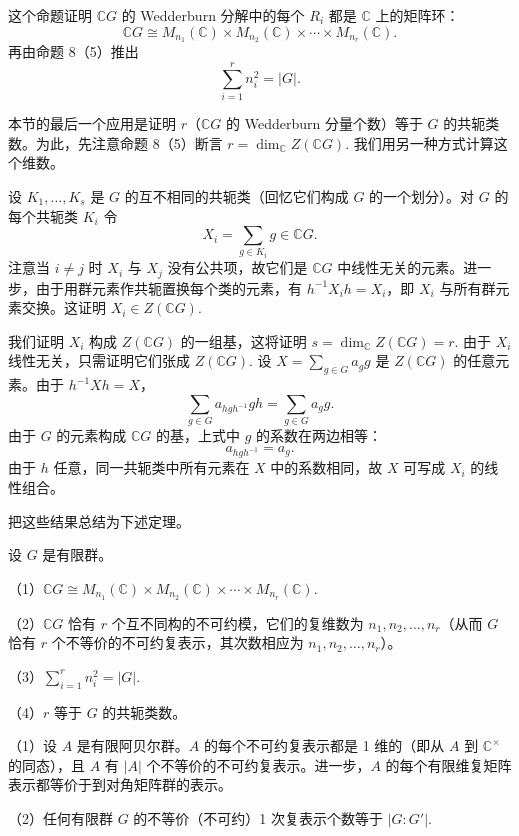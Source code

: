 这个命题证明 \(\mathbb{C}G\) 的 Wedderburn 分解中的每个 \(R_i\) 都是 \(\mathbb{C}\) 上的矩阵环：
\[
\mathbb{C}G \cong M_{n_1}(\mathbb{C}) \times M_{n_2}(\mathbb{C}) \times \cdots \times M_{n_r}(\mathbb{C}).
\]
再由命题 8（5）推出
\[
\sum_{i=1}^{r}n_i^2 = |G|.
\]

本节的最后一个应用是证明 \(r\)（\(\mathbb{C}G\) 的 Wedderburn 分量个数）等于 \(G\) 的共轭类数。为此，先注意命题 8（5）断言 \(r = \dim_{\mathbb C}Z(\mathbb{C}G)\). 我们用另一种方式计算这个维数。

设 \(K_1, \ldots, K_s\) 是 \(G\) 的互不相同的共轭类（回忆它们构成 \(G\) 的一个划分）。对 \(G\) 的每个共轭类 \(K_i\) 令
\[
X_i = \sum_{g \in K_i}g \in \mathbb{C}G.
\]
注意当 \(i \neq j\) 时 \(X_i\) 与 \(X_j\) 没有公共项，故它们是 \(\mathbb{C}G\) 中线性无关的元素。进一步，由于用群元素作共轭置换每个类的元素，有 \(h^{-1}X_ih = X_i\)，即 \(X_i\) 与所有群元素交换。这证明 \(X_i \in Z(\mathbb{C}G)\).

我们证明 \(X_i\) 构成 \(Z(\mathbb{C}G)\) 的一组基，这将证明 \(s = \dim_{\mathbb C}Z(\mathbb{C}G) = r\). 由于 \(X_i\) 线性无关，只需证明它们张成 \(Z(\mathbb{C}G)\). 设 \(X = \sum_{g \in G}a_gg\) 是 \(Z(\mathbb{C}G)\) 的任意元素。由于 \(h^{-1}Xh = X\)，
\[
\sum_{g \in G}a_{hgh^{-1}}gh = \sum_{g \in G}a_gg.
\]
由于 \(G\) 的元素构成 \(\mathbb{C}G\) 的基，上式中 \(g\) 的系数在两边相等：
\[
a_{hgh^{-1}} = a_g.
\]
由于 \(h\) 任意，同一共轭类中所有元素在 \(X\) 中的系数相同，故 \(X\) 可写成 \(X_i\) 的线性组合。

把这些结果总结为下述定理。

\begin{theorem}\label{thm:18.10}
设 \(G\) 是有限群。

（1）\(\mathbb{C}G \cong M_{n_1}(\mathbb{C}) \times M_{n_2}(\mathbb{C}) \times \cdots \times M_{n_r}(\mathbb{C})\).

（2）\(\mathbb{C}G\) 恰有 \(r\) 个互不同构的不可约模，它们的复维数为 \(n_1, n_2, \ldots, n_r\)（从而 \(G\) 恰有 \(r\) 个不等价的不可约复表示，其次数相应为 \(n_1, n_2, \ldots, n_r\)）。

（3）\(\sum_{i=1}^{r}n_i^2 = |G|\).

（4）\(r\) 等于 \(G\) 的共轭类数。
\end{theorem}

\begin{corollary}\label{cor:18.11}
（1）设 \(A\) 是有限阿贝尔群。\(A\) 的每个不可约复表示都是 1 维的（即从 \(A\) 到 \(\mathbb{C}^\times\) 的同态），且 \(A\) 有 \(|A|\) 个不等价的不可约复表示。进一步，\(A\) 的每个有限维复矩阵表示都等价于到对角矩阵群的表示。

（2）任何有限群 \(G\) 的不等价（不可约）1 次复表示个数等于 \(|G:G'|\).
\end{corollary}

